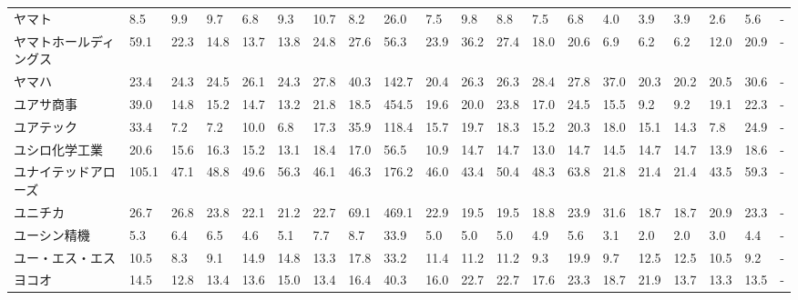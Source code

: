 \begin{longtable}[c]{lp{3mm}p{3mm}p{3mm}p{3mm}p{3mm}p{3mm}p{3mm}p{3mm}p{3mm}p{3mm}p{3mm}p{3mm}p{3mm}p{3mm}p{3mm}p{3mm}p{3mm}p{3mm}p{3mm}}
ヤマト             &    8.5 &    9.9 &       9.7 &       6.8 &        9.3 &    10.7 &     8.2 &     26.0 &     7.5 &     9.8 &    8.8 &    7.5 &     6.8 &     4.0 &     3.9 &    3.9 &    2.6 &     5.6 &      - \\
ヤマトホールディングス     &   59.1 &   22.3 &      14.8 &      13.7 &       13.8 &    24.8 &    27.6 &     56.3 &    23.9 &    36.2 &   27.4 &   18.0 &    20.6 &     6.9 &     6.2 &    6.2 &   12.0 &    20.9 &      - \\
ヤマハ             &   23.4 &   24.3 &      24.5 &      26.1 &       24.3 &    27.8 &    40.3 &    142.7 &    20.4 &    26.3 &   26.3 &   28.4 &    27.8 &    37.0 &    20.3 &   20.2 &   20.5 &    30.6 &      - \\
ユアサ商事           &   39.0 &   14.8 &      15.2 &      14.7 &       13.2 &    21.8 &    18.5 &    454.5 &    19.6 &    20.0 &   23.8 &   17.0 &    24.5 &    15.5 &     9.2 &    9.2 &   19.1 &    22.3 &      - \\
ユアテック           &   33.4 &    7.2 &       7.2 &      10.0 &        6.8 &    17.3 &    35.9 &    118.4 &    15.7 &    19.7 &   18.3 &   15.2 &    20.3 &    18.0 &    15.1 &   14.3 &    7.8 &    24.9 &      - \\
ユシロ化学工業         &   20.6 &   15.6 &      16.3 &      15.2 &       13.1 &    18.4 &    17.0 &     56.5 &    10.9 &    14.7 &   14.7 &   13.0 &    14.7 &    14.5 &    14.7 &   14.7 &   13.9 &    18.6 &      - \\
ユナイテッドアローズ      &  105.1 &   47.1 &      48.8 &      49.6 &       56.3 &    46.1 &    46.3 &    176.2 &    46.0 &    43.4 &   50.4 &   48.3 &    63.8 &    21.8 &    21.4 &   21.4 &   43.5 &    59.3 &      - \\
ユニチカ            &   26.7 &   26.8 &      23.8 &      22.1 &       21.2 &    22.7 &    69.1 &    469.1 &    22.9 &    19.5 &   19.5 &   18.8 &    23.9 &    31.6 &    18.7 &   18.7 &   20.9 &    23.3 &      - \\
ユーシン精機          &    5.3 &    6.4 &       6.5 &       4.6 &        5.1 &     7.7 &     8.7 &     33.9 &     5.0 &     5.0 &    5.0 &    4.9 &     5.6 &     3.1 &     2.0 &    2.0 &    3.0 &     4.4 &      - \\
ユー・エス・エス        &   10.5 &    8.3 &       9.1 &      14.9 &       14.8 &    13.3 &    17.8 &     33.2 &    11.4 &    11.2 &   11.2 &    9.3 &    19.9 &     9.7 &    12.5 &   12.5 &   10.5 &     9.2 &      - \\
ヨコオ             &   14.5 &   12.8 &      13.4 &      13.6 &       15.0 &    13.4 &    16.4 &     40.3 &    16.0 &    22.7 &   22.7 &   17.6 &    23.3 &    18.7 &    21.9 &   13.7 &   13.3 &    13.5 &      - \\

\end{longtable}
